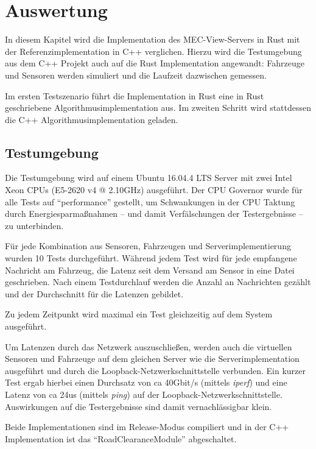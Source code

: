 
			
\chapter{Auswertung}

In diesem Kapitel wird die Implementation des MEC-View-Servers in Rust mit der Referenzimplementation in C++ verglichen.
Hierzu wird die Testumgebung aus dem C++ Projekt auch auf die Rust Implementation angewandt: Fahrzeuge und Sensoren werden simuliert und die Laufzeit dazwischen gemessen.

Im ersten Testszenario führt die Implementation in Rust eine in Rust geschriebene Algorithmusimplementation aus.
Im zweiten Schritt wird stattdessen die C++ Algorithmusimplementation geladen.



\section{Testumgebung}

Die Testumgebung wird auf einem Ubuntu 16.04.4 LTS Server mit zwei Intel Xeon CPUs (E5-2620 v4 @ 2.10GHz) ausgeführt.
Der CPU Governor wurde für alle Tests auf \enquote{performance} gestellt, um Schwankungen in der CPU Taktung durch Energiesparmaßnahmen -- und damit Verfälschungen der Testergebnisse -- zu unterbinden.

Für jede Kombination aus Sensoren, Fahrzeugen und Serverimplementierung wurden 10 Tests durchgeführt.
Während jedem Test wird für jede empfangene Nachricht am Fahrzeug, die Latenz seit dem Versand am Sensor in eine Datei geschrieben.
Nach einem Testdurchlauf werden die Anzahl an Nachrichten gezählt und der Durchschnitt für die Latenzen gebildet.

Zu jedem Zeitpunkt wird maximal ein Test gleichzeitig auf dem System ausgeführt.

Um Latenzen durch das Netzwerk auszuschließen, werden auch die virtuellen Sensoren und Fahrzeuge auf dem gleichen Server wie die Serverimplementation ausgeführt und durch die Loopback-Netzwerkschnittstelle verbunden.
Ein kurzer Test ergab hierbei einen Durchsatz von ca 40Gbit/s (mittels \textit{iperf}) und eine Latenz von ca 24us (mittels \textit{ping}) auf der Loopback-Netzwerkschnittstelle.
Auswirkungen auf die Testergebnisse sind damit vernachlässigbar klein.

Beide Implementationen sind im Release-Modus compiliert und in der C++ Implementation ist das \enquote{RoadClearanceModule} abgeschaltet.


